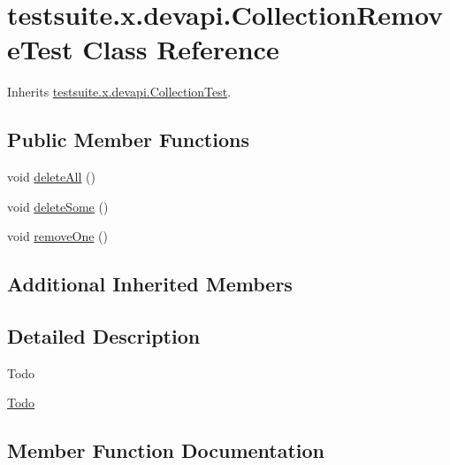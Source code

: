\hypertarget{classtestsuite_1_1x_1_1devapi_1_1_collection_remove_test}{}\section{testsuite.\+x.\+devapi.\+Collection\+Remove\+Test Class Reference}
\label{classtestsuite_1_1x_1_1devapi_1_1_collection_remove_test}


Inherits \mbox{\hyperlink{classtestsuite_1_1x_1_1devapi_1_1_collection_test}{testsuite.\+x.\+devapi.\+Collection\+Test}}.

\subsection*{Public Member Functions}
\begin{DoxyCompactItemize}
\item 
void \mbox{\hyperlink{classtestsuite_1_1x_1_1devapi_1_1_collection_remove_test_aa19755b80ccaa64b8e837e62c9cf4771}{delete\+All}} ()
\item 
void \mbox{\hyperlink{classtestsuite_1_1x_1_1devapi_1_1_collection_remove_test_a8fe87fd6558d6d9a1b380f1681357bcc}{delete\+Some}} ()
\item 
void \mbox{\hyperlink{classtestsuite_1_1x_1_1devapi_1_1_collection_remove_test_abeedf7f001dc70e388e11e9bf7624331}{remove\+One}} ()
\end{DoxyCompactItemize}
\subsection*{Additional Inherited Members}


\subsection{Detailed Description}
\begin{DoxyRefDesc}{Todo}
\item[\mbox{\hyperlink{todo__todo000007}{Todo}}]\end{DoxyRefDesc}


\subsection{Member Function Documentation}
\mbox{\label{classtestsuite_1_1x_1_1devapi_1_1_collection_remove_test_aa19755b80ccaa64b8e837e62c9cf4771}} 
